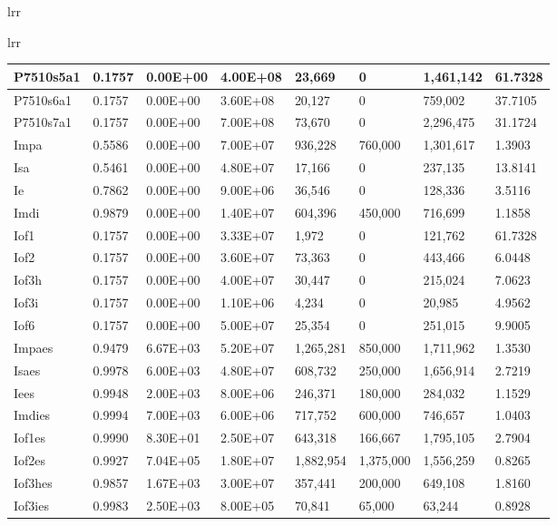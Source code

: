 \begin{table}[H]
\begin{tabular}{lrr}
\begin{table}[!ht]
\begin{tabular}{lrr}
\begin{tabular}{|l|l|l|l|l|l|l|l|}
        P7510s5a1 & 0.1757 & 0.00E+00 & 4.00E+08 & 23,669 & 0 & 1,461,142 & 61.7328 \\ \hline
        P7510s6a1 & 0.1757 & 0.00E+00 & 3.60E+08 & 20,127 & 0 & 759,002 & 37.7105 \\ \hline
        P7510s7a1 & 0.1757 & 0.00E+00 & 7.00E+08 & 73,670 & 0 & 2,296,475 & 31.1724 \\ \hline
        Impa & 0.5586 & 0.00E+00 & 7.00E+07 & 936,228 & 760,000 & 1,301,617 & 1.3903 \\ \hline
        Isa & 0.5461 & 0.00E+00 & 4.80E+07 & 17,166 & 0 & 237,135 & 13.8141 \\ \hline
        Ie & 0.7862 & 0.00E+00 & 9.00E+06 & 36,546 & 0 & 128,336 & 3.5116 \\ \hline
        Imdi & 0.9879 & 0.00E+00 & 1.40E+07 & 604,396 & 450,000 & 716,699 & 1.1858 \\ \hline
        Iof1 & 0.1757 & 0.00E+00 & 3.33E+07 & 1,972 & 0 & 121,762 & 61.7328 \\ \hline
        Iof2 & 0.1757 & 0.00E+00 & 3.60E+07 & 73,363 & 0 & 443,466 & 6.0448 \\ \hline
        Iof3h & 0.1757 & 0.00E+00 & 4.00E+07 & 30,447 & 0 & 215,024 & 7.0623 \\ \hline
        Iof3i & 0.1757 & 0.00E+00 & 1.10E+06 & 4,234 & 0 & 20,985 & 4.9562 \\ \hline
        Iof6 & 0.1757 & 0.00E+00 & 5.00E+07 & 25,354 & 0 & 251,015 & 9.9005 \\ \hline
        Impaes & 0.9479 & 6.67E+03 & 5.20E+07 & 1,265,281 & 850,000 & 1,711,962 & 1.3530 \\ \hline
        Isaes & 0.9978 & 6.00E+03 & 4.80E+07 & 608,732 & 250,000 & 1,656,914 & 2.7219 \\ \hline
        Iees & 0.9948 & 2.00E+03 & 8.00E+06 & 246,371 & 180,000 & 284,032 & 1.1529 \\ \hline
        Imdies & 0.9994 & 7.00E+03 & 6.00E+06 & 717,752 & 600,000 & 746,657 & 1.0403 \\ \hline
        Iof1es & 0.9990 & 8.30E+01 & 2.50E+07 & 643,318 & 166,667 & 1,795,105 & 2.7904 \\ \hline
        Iof2es & 0.9927 & 7.04E+05 & 1.80E+07 & 1,882,954 & 1,375,000 & 1,556,259 & 0.8265 \\ \hline
        Iof3hes & 0.9857 & 1.67E+03 & 3.00E+07 & 357,441 & 200,000 & 649,108 & 1.8160 \\ \hline
        Iof3ies & 0.9983 & 2.50E+03 & 8.00E+05 & 70,841 & 65,000 & 63,244 & 0.8928 \\ \hline

\end{tabular}
\end{tabular}
\end{table}
\end{tabular}
\end{table}
